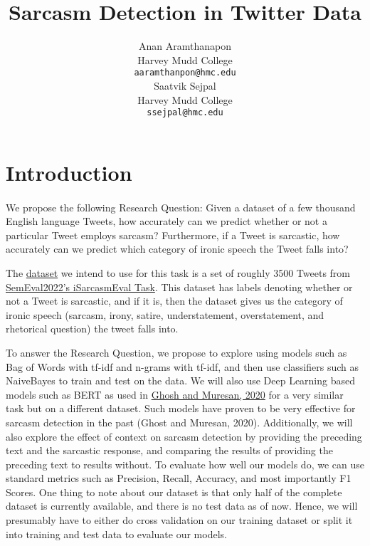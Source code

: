 \documentclass[11pt,a4paper]{article}
\title{Sarcasm Detection in Twitter Data}
\author{Anan Aramthanapon \\
  Harvey Mudd College \\
  \texttt{aaramthanpon@hmc.edu} \\\And
  Saatvik Sejpal \\
  Harvey Mudd College \\
  \texttt{ssejpal@hmc.edu} \\}
\date{}
\begin{document}
\maketitle

\section{Introduction}

\paragraph{} We propose the following Research Question: Given a dataset of a few thousand English language Tweets, how accurately can we predict whether or not a particular Tweet employs sarcasm?
Furthermore, if a Tweet is sarcastic, how accurately can we predict which category of ironic speech the Tweet falls into?

The \href{https://edinburghnlp.inf.ed.ac.uk/workshops/SemEval2022/train.En.csv}{dataset} we intend to use for this task is a set of roughly 3500 Tweets from \href{https://sites.google.com/view/semeval2022-isarcasmeval}{SemEval2022's iSarcasmEval Task}. This dataset has labels denoting whether or not a Tweet is sarcastic, and if it is, then the dataset gives us the category of ironic speech (sarcasm, irony, satire, understatement, overstatement, and rhetorical question) the tweet falls into.

To answer the Research Question, we propose to explore using models such as Bag of Words with tf-idf and n-grams with tf-idf, and then use classifiers such as NaiveBayes to train and test on the data. 
We will also use Deep Learning based models such as BERT as used in \href{https://arxiv.org/pdf/2005.05814.pdf}{Ghosh and Muresan, 2020} for a very similar task but on a different dataset. Such models have proven to be very effective for sarcasm detection in the past (Ghost and Muresan, 2020).
Additionally, we will also explore the effect of context on sarcasm detection by providing the preceding text and the sarcastic response, and comparing the results of providing the preceding text to results without.
To evaluate how well our models do, we can use standard metrics such as Precision, Recall, Accuracy, and most importantly F1 Scores.
One thing to note about our dataset is that only half of the complete dataset is currently available, and there is no test data as of now. Hence, we will presumably have to either do cross validation on our training dataset or split it into training and test data to evaluate our models.
\end{document}
